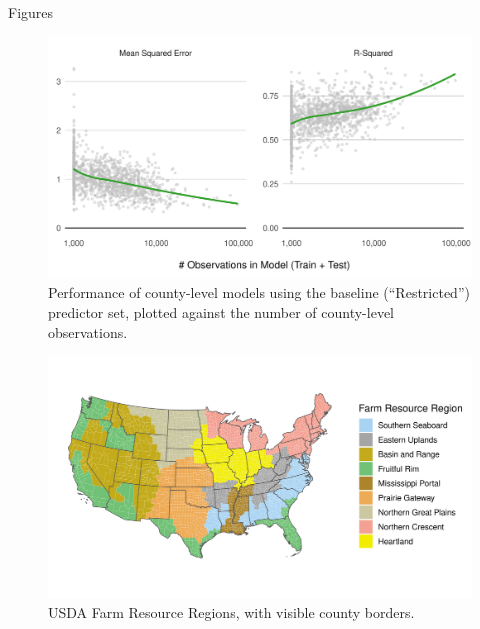 \documentclass[12pt]{article}
\begin{document}
\newpage

\vspace*{200pt}

\begin{huge}
    \begin{center}
        Figures
    \end{center}
\end{huge}

\newpage

\begin{figure}[H]
    \centering
    \includegraphics[width=1\textwidth]{exhibits/compare_county_nobs_perf.png}
    \caption{Performance of county-level models using the baseline (``Restricted'') predictor set, plotted against the number of county-level observations.}
    \label{fig:compare_county_nobs_perf}
\end{figure}

\begin{figure}[H]
    \centering
    \includegraphics[width=1\textwidth]{exhibits/FRR_map.png}
    \caption{USDA Farm Resource Regions, with visible county borders.}
    \label{fig:FRR_map}
\end{figure}
\end{document}
